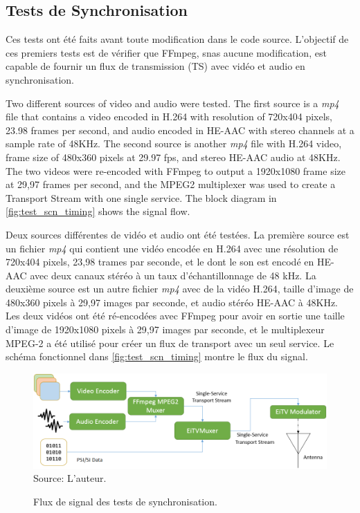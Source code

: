 \documentclass[12pt,a4paper]{article}
\begin{document}
\subsection{Tests de Synchronisation}

Ces tests ont été faits avant toute modification dans le code source. L'objectif de ces premiers tests est de vérifier que FFmpeg, snas aucune modification, est capable de fournir un flux de transmission (TS) avec vidéo et audio en synchronisation.

Two different sources of video and audio were tested. The first source is a \textit{mp4} file that contains a video encoded in H.264 with resolution of 720x404 pixels, 23.98 frames per second, and audio encoded in HE-AAC with stereo channels at a sample rate of 48KHz. The second source is another \textit{mp4} file with H.264 video, frame size of 480x360 pixels at 29.97 fps, and stereo HE-AAC audio at 48KHz. The two videos were re-encoded with FFmpeg to output a 1920x1080 frame size at 29,97 frames per second, and the MPEG2 multiplexer was used to create a Transport Stream with one single service. The block diagram in \autoref{fig:test_scn_timing} shows the signal flow.

Deux sources différentes de vidéo et audio ont été testées. La première source est un fichier \textit{mp4} qui contient une vidéo encodée en H.264 avec une résolution de 720x404 pixels, 23,98 trames par seconde, et le dont le son est encodé en HE-AAC avec deux canaux stéréo à un taux d'échantillonnage de 48 kHz. La deuxième source est un autre fichier \textit {mp4} avec de la vidéo H.264, taille d'image de 480x360 pixels à 29,97 images par seconde, et audio stéréo HE-AAC à 48KHz. Les deux vidéos ont été ré-encodées avec FFmpeg pour avoir en sortie une taille d'image de 1920x1080 pixels à 29,97 images par seconde, et le multiplexeur MPEG-2 a été utilisé pour créer un flux de transport avec un seul service. Le schéma fonctionnel dans \autoref{fig:test_scn_timing} montre le flux du signal.

\begin{figure}[!hb]
\centering
\caption{Flux de signal des tests de synchronisation.}
\includegraphics[width=0.9\linewidth]{pictures/test_scn_timing.png}
\\Source: L'auteur.
\label{fig:test_scn_timing}
\end{figure}
\end{document}
